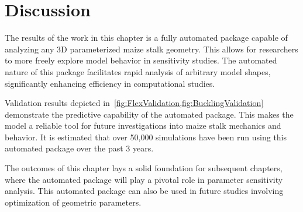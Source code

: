 \section{Discussion}
\label{sec:automation_discussion}
The results of the work in this chapter is a fully automated package capable of analyzing any 3D parameterized maize stalk geometry. This allows for researchers to more freely explore model behavior in sensitivity studies. The automated nature of this package facilitates rapid analysis of arbitrary model shapes, significantly enhancing efficiency in computational studies.

Validation results depicted in~\cref{fig:FlexValidation,fig:BucklingValidation} demonstrate the predictive capability of the automated package.  This makes the model a reliable tool for future investigations into maize stalk mechanics and behavior. It is estimated that over 50,000 simulations have been run using this automated package over the past 3 years.

The outcomes of this chapter lays a solid foundation for subsequent chapters, where the automated package will play a pivotal role in parameter sensitivity analysis. This automated package can also be used in future studies involving optimization of geometric parameters. 

